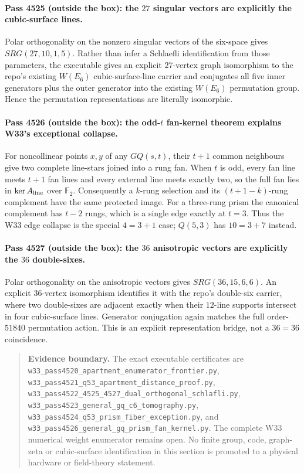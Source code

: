 \paragraph{Pass 4525 (outside the box): the $27$ singular vectors are explicitly the cubic-surface lines.}
Polar orthogonality on the nonzero singular vectors of the six-space gives
$SRG(27,10,1,5)$.  Rather than infer a Schlaefli identification from those
parameters, the executable gives an explicit $27$-vertex graph isomorphism to
the repo's existing $W(E_6)$ cubic-surface-line carrier and conjugates all five
inner generators plus the outer generator into the existing $W(E_6)$
permutation group.  Hence the permutation representations are literally
isomorphic.

\paragraph{Pass 4526 (outside the box): the odd-$t$ fan-kernel theorem explains W33's exceptional collapse.}
For noncollinear points $x,y$ of any $GQ(s,t)$, their $t+1$ common neighbours
give two complete line-stars joined into a rung fan.  When $t$ is odd, every
fan line meets $t+1$ fan lines and every external line meets exactly two, so the
full fan lies in $\ker A_{\rm line}$ over $\mathbb F_2$.  Consequently a
$k$-rung selection and its $(t+1-k)$-rung complement have the same protected
image.  For a three-rung prism the canonical complement has $t-2$ rungs, which
is a single edge exactly at $t=3$.  Thus the W33 edge collapse is the special
$4=3+1$ case; $Q(5,3)$ has $10=3+7$ instead.

\paragraph{Pass 4527 (outside the box): the $36$ anisotropic vectors are explicitly the $36$ double-sixes.}
Polar orthogonality on the anisotropic vectors gives $SRG(36,15,6,6)$.  An
explicit $36$-vertex isomorphism identifies it with the repo's double-six
carrier, where two double-sixes are adjacent exactly when their $12$-line
supports intersect in four cubic-surface lines.  Generator conjugation again
matches the full order-$51840$ permutation action.  This is an explicit
representation bridge, not a $36=36$ coincidence.

\begin{quote}\small
\textbf{Evidence boundary.}  The exact executable certificates are
\texttt{w33\_pass4520\_apartment\_enumerator\_frontier.py},
\texttt{w33\_pass4521\_q53\_apartment\_distance\_proof.py},
\texttt{w33\_pass4522\_4525\_4527\_dual\_orthogonal\_schlafli.py},
\texttt{w33\_pass4523\_general\_gq\_c6\_tomography.py},
\texttt{w33\_pass4524\_q53\_prism\_fiber\_exception.py}, and
\texttt{w33\_pass4526\_general\_gq\_prism\_fan\_kernel.py}.
The complete W33 numerical weight enumerator remains open.  No finite group,
code, graph-zeta or cubic-surface identification in this section is promoted to
a physical hardware or field-theory statement.
\end{quote}
